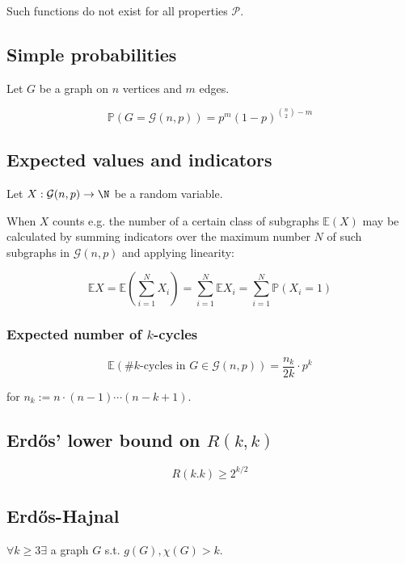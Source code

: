 Such functions do not exist for all properties $\mathcal{P}$.

\subsection*{Simple probabilities}

Let $G$ be a graph on $n$ vertices and $m$ edges.

\vspace*{-2mm}
$$\mathbb{P}(G = \mathcal{G}(n,p)) = p^m (1-p)^{{n \choose 2}-m}$$

\subsection*{Expected values and indicators}

Let $X : \mathcal{G}(n,p) \to \N$ be a random variable.

When $X$ counts e.g. the number of a certain class of subgraphs $\mathbb{E}(X)$ may be calculated by summing indicators over the maximum number $N$ of such subgraphs in $\mathcal{G}(n,p)$ and applying linearity:

\vspace*{-4mm}
$$\mathbb{E}X = \mathbb{E}\left(\sum_{i=1}^N X_i\right) = \sum_{i=1}^N \mathbb{E}X_i = \sum_{i=1}^N \mathbb{P}(X_i=1)$$

\subsubsection*{Expected number of $k$-cycles}

$$\mathbb{E}(\#k\text{-cycles in } G \in \mathcal{G}(n,p)) = \frac{n_k}{2k} \cdot p^k$$

for $n_k := n \cdot (n-1) \cdots (n-k+1)$.

\subsection*{Erd\H{o}s' lower bound on $R(k,k)$}

$$R(k.k) \geq 2^{k/2}$$

\subsection*{Erd\H{o}s-Hajnal}

$\forall k \geq 3 \exists$ a graph $G$ s.t. $g(G), \chi(G) > k$.

